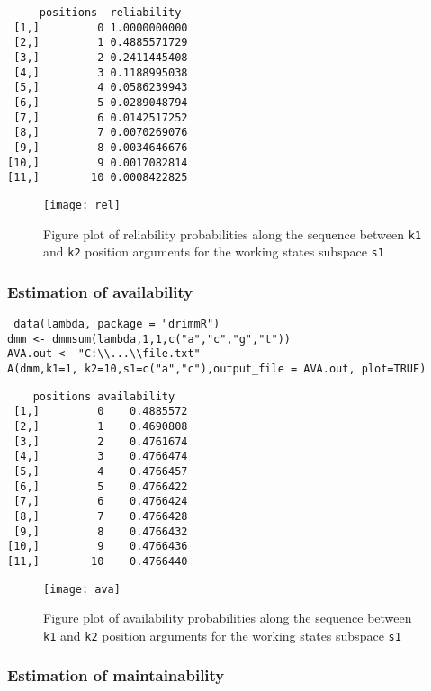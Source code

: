\documentclass[article,nojss]{jss}\usepackage[]{graphicx}\usepackage[]{color}
\begin{document}
\begin{lstlisting}
     positions  reliability
 [1,]         0 1.0000000000
 [2,]         1 0.4885571729
 [3,]         2 0.2411445408
 [4,]         3 0.1188995038
 [5,]         4 0.0586239943
 [6,]         5 0.0289048794
 [7,]         6 0.0142517252
 [8,]         7 0.0070269076
 [9,]         8 0.0034646676
[10,]         9 0.0017082814
[11,]        10 0.0008422825
\end{lstlisting}


\begin{figure}[htbp]
\centering
\texttt{[image: rel]}
\caption{Figure plot of reliability probabilities along the sequence between {\tt k1} and {\tt k2} position arguments for the working states subspace  {\tt s1} }
\end{figure}

\clearpage

\subsubsection{Estimation of availability} \label{subsection_pack_avail}


\begin{lstlisting}
 data(lambda, package = "drimmR")
dmm <- dmmsum(lambda,1,1,c("a","c","g","t"))
AVA.out <- "C:\\...\\file.txt"
A(dmm,k1=1, k2=10,s1=c("a","c"),output_file = AVA.out, plot=TRUE)
\end{lstlisting}

\begin{lstlisting}
    positions availability
 [1,]         0    0.4885572
 [2,]         1    0.4690808
 [3,]         2    0.4761674
 [4,]         3    0.4766474
 [5,]         4    0.4766457
 [6,]         5    0.4766422
 [7,]         6    0.4766424
 [8,]         7    0.4766428
 [9,]         8    0.4766432
[10,]         9    0.4766436
[11,]        10    0.4766440
\end{lstlisting}

\begin{figure}[htbp]
\centering
\texttt{[image: ava]}
\caption{Figure plot of availability probabilities along the sequence between {\tt k1} and {\tt k2} position arguments for the working states subspace  {\tt s1} }
\end{figure}

\clearpage


\subsubsection{Estimation of maintainability} \label{subsection_pack_maintain}
\end{document}
